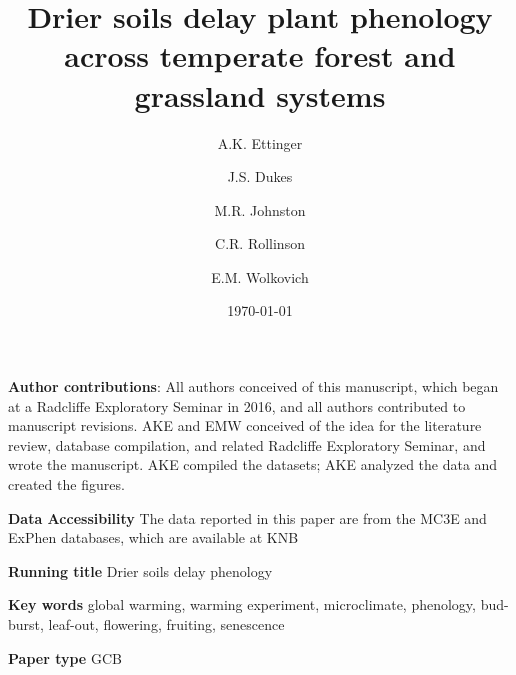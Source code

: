 \documentclass{article}
\begin{document}



\title{Drier soils delay plant phenology across temperate forest and grassland systems} 
\author[1,2,a]{A.K. Ettinger}
\author[3,b]{J.S. Dukes}
\author[4,c]{M.R. Johnston}
\author[5,d]{C.R. Rollinson}
\author[1,4,6,e]{E.M. Wolkovich}









\date{\today}
\maketitle 
\textbf{Author contributions}: All authors conceived of this manuscript, which began at a Radcliffe Exploratory Seminar in 2016, and all authors contributed to manuscript revisions. AKE and EMW conceived of the idea for the literature review, database compilation, and related Radcliffe Exploratory Seminar, and wrote the manuscript. AKE compiled the datasets; AKE analyzed the data and created the figures.

\textbf{Data Accessibility} 
The data reported in this paper are from the MC3E and ExPhen databases, which are available at KNB \citep{ettinger2018,ettinger2022}

\textbf{Running title} Drier soils delay phenology

\textbf{Key words} global warming, warming experiment, microclimate, phenology, bud-burst, leaf-out, flowering, fruiting, senescence 


\textbf{Paper type} GCB %
\end{document}
